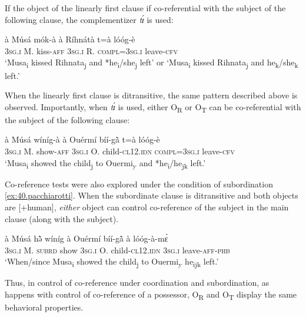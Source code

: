 \documentclass[output=paper]{langsci/langscibook}
\begin{document}
If the object of the linearly first clause if co-referential with the subject of the following clause, the complementizer \textit{tɪ́} is used:

\ea
\label{ex:38.pacchiarotti}
\gll \`{a}    M\'{u}s\'{a}  m\'{o}k-\`{a}    \`{a}    R\'{i}hn\'{a}t\`{a}  t=\`{a}        l\'{o}\'{o}g-\`{e}\\
\textsc{3sg.i  }  M.  kiss-\textsc{aff}  \textsc{3sg.i  }  R.    \textsc{compl=3sg.i  }    leave-\textsc{cfv}\\
\glt `Musa\textsubscript{i} kissed Rihnata\textsubscript{j} and *he\textsubscript{i}/she\textsubscript{j} left' or `Musa\textsubscript{i} kissed Rihnata\textsubscript{j} and he\textsubscript{k}/she\textsubscript{k} left.'
\z

When the linearly first clause is ditransitive, the same pattern described above is observed. Importantly, when \textit{tɪ́} is used, either O\textsubscript{R} or O\textsubscript{T} can be co-referential with the subject of the following clause:

\ea
\label{ex:39.pacchiarotti}
\gll \`{a}    M\'{u}s\'{a}  w\'{i}n\'{i}g-\`{a}  \`{a}    Ouérm\'{i}  b\'{i}\'{i}-g\`{\~{a}}  t=\`{a}      l\'{o}\'{o}g-\`{e} \\     
\textsc{3sg.i  }  M.  show-\textsc{aff}  \textsc{3sg.i  }  O.    child-\textsc{cl12.idn} \textsc{  compl=3sg.i}        leave-\textsc{cfv}\\
\glt `Musa\textsubscript{i}  showed the child\textsubscript{j} to Ouermi\textsubscript{y} and *he\textsubscript{i}/he\textsubscript{jk} left.'
\z

Co-reference tests were also explored under the condition of subordination \ref{ex:40.pacchiarotti}. When the subordinate clause is ditransitive and both objects are [+human], \textit{either} object can control co-reference of the subject in the main clause (along with the subject).

\ea
\label{ex:40.pacchiarotti}
\gll \`{a} M\'{u}s\'{a} hə̃̀ w\'{i}n\'{i}g \`{a} Ouérm\'{i} b\'{i}\'{i}-g\`{\~{a}} \`{a} l\'{o}\'{o}g-\`{a}-mɛ̀\\
\textsc{3sg.i  }  M.  \textsc{subrd}    show  \textsc{3sg.i  }  O.        child-\textsc{cl12.idn} \textsc{3sg.i  }  leave-\textsc{aff-phb}\\
\glt `When/since Musa\textsubscript{i} showed the child\textsubscript{j} to Ouermi\textsubscript{y} he\textsubscript{ijk} left.'
\z

Thus, in control of co-reference under coordination and subordination, as happens with control of co-reference of a possessor, O\textsubscript{R} and O\textsubscript{T} display the same behavioral properties. 
\end{document}
